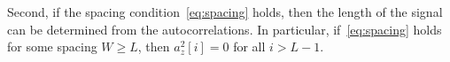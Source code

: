 \documentclass[english,11pt]{article}
\newcommand{\1}{\mathbf{1}}
\numberwithin{equation}{section}
\theoremstyle{plain}
\theoremstyle{definition}
\theoremstyle{remark}
\theoremstyle{plain}
\theoremstyle{remark}
\theoremstyle{plain}
\theoremstyle{plain}
\newtheorem{proposition}[thm]{\protect\propositionname}
\providecommand{\propositionname}{Proposition}
\newcommand{\RL}{\mathbb{R}^L}
\newcommand{\SNR}{\ensuremath{\textsf{SNR}}}
\begin{document}
Second, if the spacing condition~\eqref{eq:spacing} holds, then the length of the signal can be determined from the autocorrelations.
In particular, if~\eqref{eq:spacing} holds for some spacing $W\geq L$, then $a_z^2[i]=0$ for all $i>L-1$.

\end{document}
